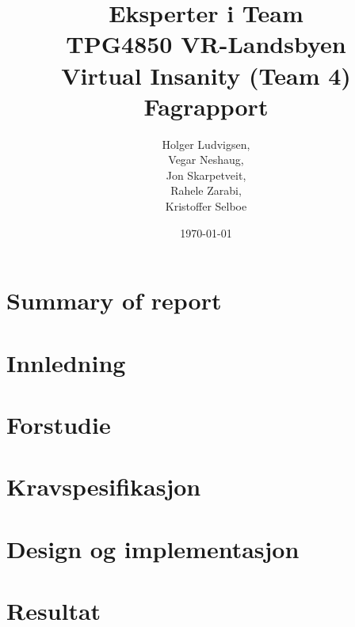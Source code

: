 \documentclass[12pt]{report}
\title{{\Large Eksperter i Team\\TPG4850 VR-Landsbyen\\{\bf Virtual Insanity (Team 4)\\Fagrapport}}}
\author{Holger Ludvigsen,\\Vegar Neshaug,\\Jon Skarpetveit,\\Rahele Zarabi,\\Kristoffer Selboe}
\date{{\small \today}}
\begin{document}
\maketitle

\chapter{Summary of report}
	
\pagebreak
	
\setlength{\parskip}{0.0in}
\tableofcontents
\setlength{\parskip}{0.1in}

\chapter{Innledning}

	

\chapter{Forstudie}

	

\chapter{Kravspesifikasjon}

	
	
\chapter{Design og implementasjon}

	

\chapter{Resultat}

	




%	

	

\end{document}
